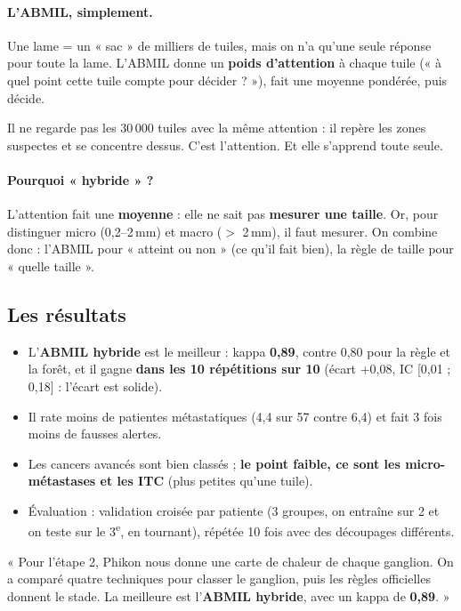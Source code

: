 \documentclass[11pt,a4paper]{article}
\begin{document}
\paragraph{L'ABMIL, simplement.} Une lame = un « sac » de milliers de tuiles, mais on n'a qu'une seule réponse pour toute la lame.
L'ABMIL donne un \textbf{poids d'attention} à chaque tuile (« à quel point cette tuile compte pour décider ? »), fait une moyenne
pondérée, puis décide.
\begin{analogie}
Il ne regarde pas les 30\,000 tuiles avec la même attention : il repère les zones suspectes et se concentre dessus. C'est
l'attention. Et elle s'apprend toute seule.
\end{analogie}

\paragraph{Pourquoi « hybride » ?} L'attention fait une \textbf{moyenne} : elle ne sait pas \textbf{mesurer une taille}. Or, pour
distinguer micro (0,2–2\,mm) et macro ($>$ 2\,mm), il faut mesurer. On combine donc : l'ABMIL pour « atteint ou non » (ce qu'il fait
bien), la règle de taille pour « quelle taille ».

\subsection{Les résultats}
\begin{itemize}
  \item L'\textbf{ABMIL hybride} est le meilleur : kappa \textbf{0,89}, contre 0,80 pour la règle et la forêt, et il gagne \textbf{dans
        les 10 répétitions sur 10} (écart +0,08, IC [0,01 ; 0,18] : l'écart est solide).
  \item Il rate moins de patientes métastatiques (4,4 sur 57 contre 6,4) et fait 3 fois moins de fausses alertes.
  \item Les cancers avancés sont bien classés ; \textbf{le point faible, ce sont les micro-métastases et les ITC} (plus petites qu'une tuile).
  \item Évaluation : validation croisée par patiente (3 groupes, on entraîne sur 2 et on teste sur le 3\textsuperscript{e}, en tournant),
        répétée 10 fois avec des découpages différents.
\end{itemize}

\begin{oral}
« Pour l'étape 2, Phikon nous donne une carte de chaleur de chaque ganglion. On a comparé quatre techniques pour classer le ganglion,
puis les règles officielles donnent le stade. La meilleure est l'\textbf{ABMIL hybride}, avec un kappa de \textbf{0,89}. »
\end{oral}
\end{document}
